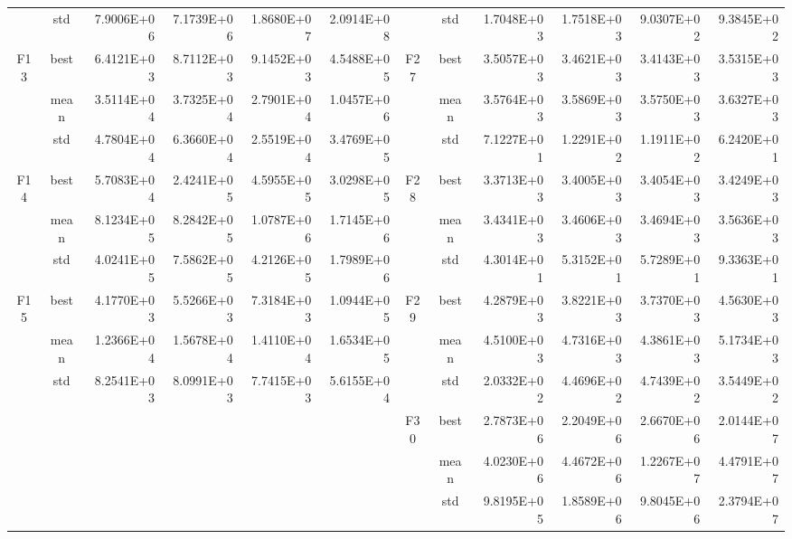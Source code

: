 \documentclass{wzuthesis}
\begin{document}
\begin{table}[htbp]
\begin{tabular}{rrrrrrccrrrr}
          & \multicolumn{1}{c}{std} & 7.9006E+06 & 7.1739E+06 & 1.8680E+07 & 2.0914E+08 &       & std   & 1.7048E+03 & 1.7518E+03 & 9.0307E+02 & 9.3845E+02 \\
    \multicolumn{1}{c}{\multirow{3}[0]{*}{F13}} & \multicolumn{1}{c}{best} & 6.4121E+03 & 8.7112E+03 & 9.1452E+03 & 4.5488E+05 & \multirow{3}[0]{*}{F27} & best  & 3.5057E+03 & 3.4621E+03 & 3.4143E+03 & 3.5315E+03 \\
          & \multicolumn{1}{c}{mean} & 3.5114E+04 & 3.7325E+04 & 2.7901E+04 & 1.0457E+06 &       & mean  & 3.5764E+03 & 3.5869E+03 & 3.5750E+03 & 3.6327E+03 \\
          & \multicolumn{1}{c}{std} & 4.7804E+04 & 6.3660E+04 & 2.5519E+04 & 3.4769E+05 &       & std   & 7.1227E+01 & 1.2291E+02 & 1.1911E+02 & 6.2420E+01 \\
    \multicolumn{1}{c}{\multirow{3}[0]{*}{F14}} & \multicolumn{1}{c}{best} & 5.7083E+04 & 2.4241E+05 & 4.5955E+05 & 3.0298E+05 & \multirow{3}[0]{*}{F28} & best  & 3.3713E+03 & 3.4005E+03 & 3.4054E+03 & 3.4249E+03 \\
          & \multicolumn{1}{c}{mean} & 8.1234E+05 & 8.2842E+05 & 1.0787E+06 & 1.7145E+06 &       & mean  & 3.4341E+03 & 3.4606E+03 & 3.4694E+03 & 3.5636E+03 \\
          & \multicolumn{1}{c}{std} & 4.0241E+05 & 7.5862E+05 & 4.2126E+05 & 1.7989E+06 &       & std   & 4.3014E+01 & 5.3152E+01 & 5.7289E+01 & 9.3363E+01 \\
    \multicolumn{1}{c}{\multirow{3}[0]{*}{F15}} & \multicolumn{1}{c}{best} & 4.1770E+03 & 5.5266E+03 & 7.3184E+03 & 1.0944E+05 & \multirow{3}[0]{*}{F29} & best  & 4.2879E+03 & 3.8221E+03 & 3.7370E+03 & 4.5630E+03 \\
          & \multicolumn{1}{c}{mean} & 1.2366E+04 & 1.5678E+04 & 1.4110E+04 & 1.6534E+05 &       & mean  & 4.5100E+03 & 4.7316E+03 & 4.3861E+03 & 5.1734E+03 \\
          & \multicolumn{1}{c}{std} & 8.2541E+03 & 8.0991E+03 & 7.7415E+03 & 5.6155E+04 &       & std   & 2.0332E+02 & 4.4696E+02 & 4.7439E+02 & 3.5449E+02 \\
          &       &       &       &       &       & \multirow{3}[0]{*}{F30} & best  & 2.7873E+06 & 2.2049E+06 & 2.6670E+06 & 2.0144E+07 \\
          &       &       &       &       &       &       & mean  & 4.0230E+06 & 4.4672E+06 & 1.2267E+07 & 4.4791E+07 \\
          &       &       &       &       &       &       & std   & 9.8195E+05 & 1.8589E+06 & 9.8045E+06 & 2.3794E+07 \\
	\bottomrule
    \end{tabular}%
  \label{tb:irime-ablation-dim30}%
\end{table}%
\end{document}
